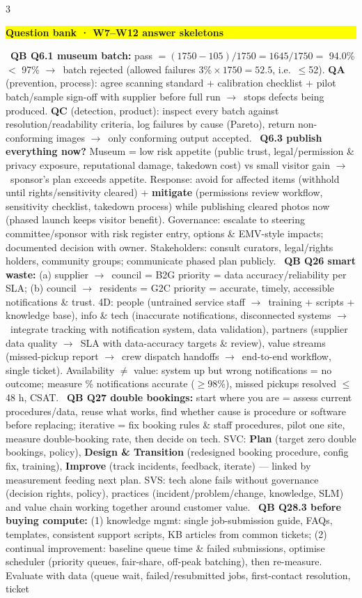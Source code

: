\documentclass[a4paper,landscape]{article}
\newcommand{\hlhighlight}[1]{\begingroup\setlength{\fboxsep}{0pt}\colorbox{yellow}{\strut\textbf{#1}}\endgroup}
\newcommand{\lbl}[1]{\textbf{#1}}
\newcommand{\kh}[1]{{\setlength{\fboxsep}{0.5pt}\colorbox{keyhlcolor}{#1}}}
\newcommand{\ra}{$\rightarrow$}
\begin{document}
\begin{multicols}{3}
\par\smallskip\noindent\hlhighlight{Question bank · W7--W12 answer skeletons}\ \lbl{QB Q6.1 museum batch:} pass $=(1750-105)/1750=1645/1750=$ \kh{94.0\% $<$ 97\%} \ra\ \kh{batch rejected} (allowed failures $3\%\times1750=52.5$, i.e.\ $\le$52). \lbl{QA} (prevention, process): agree scanning standard + calibration checklist + pilot batch/sample sign-off with supplier before full run \ra\ stops defects being produced. \lbl{QC} (detection, product): inspect every batch against resolution/readability criteria, log failures by cause (Pareto), return non-conforming images \ra\ only conforming output accepted. \textbullet\ \lbl{Q6.3 publish everything now?} Museum = \kh{low risk appetite} (public trust, legal/permission \& privacy exposure, reputational damage, takedown cost) vs small visitor gain \ra\ sponsor's plan exceeds appetite. Response: \kh{avoid} for affected items (withhold until rights/sensitivity cleared) + \lbl{mitigate} (permissions review workflow, sensitivity checklist, takedown process) while publishing cleared photos now (phased launch keeps visitor benefit). Governance: escalate to steering committee/sponsor with risk register entry, options \& EMV-style impacts; documented decision with owner. Stakeholders: consult curators, legal/rights holders, community groups; communicate phased plan publicly. \textbullet\ \lbl{QB Q26 smart waste:} (a) supplier \ra\ council = \kh{B2G} priority = data accuracy/reliability per SLA; (b) council \ra\ residents = \kh{G2C} priority = accurate, timely, accessible notifications \& trust. 4D: people (untrained service staff \ra\ training + scripts + knowledge base), info \& tech (inaccurate notifications, disconnected systems \ra\ integrate tracking with notification system, data validation), partners (supplier data quality \ra\ SLA with data-accuracy targets \& review), value streams (missed-pickup report \ra\ crew dispatch handoffs \ra\ end-to-end workflow, single ticket). Availability $\ne$ value: system up but wrong notifications = no outcome; measure \% notifications accurate ($\ge$98\%), missed pickups resolved $\le$48 h, CSAT. \textbullet\ \lbl{QB Q27 double bookings:} start where you are = assess current procedures/data, reuse what works, find whether cause is procedure or software before replacing; iterative = fix booking rules \& staff procedures, pilot one site, measure double-booking rate, then decide on tech. SVC: \lbl{Plan} (target zero double bookings, policy), \lbl{Design \& Transition} (redesigned booking procedure, config fix, training), \lbl{Improve} (track incidents, feedback, iterate) --- linked by measurement feeding next plan. SVS: tech alone fails without governance (decision rights, policy), practices (incident/problem/change, knowledge, SLM) and value chain working together around customer value. \textbullet\ \lbl{QB Q28.3 before buying compute:} (1) \kh{knowledge mgmt}: single job-submission guide, FAQs, templates, consistent support scripts, KB articles from common tickets; (2) \kh{continual improvement}: baseline queue time \& failed submissions, optimise scheduler (priority queues, fair-share, off-peak batching), then re-measure. Evaluate with data (queue wait, failed/resubmitted jobs, first-contact resolution, ticket 
\end{multicols}
\end{document}
